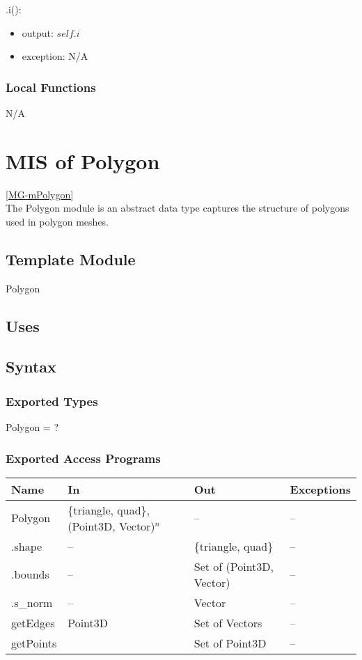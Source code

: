 \documentclass[12pt, titlepage]{article}
\begin{document}
\noindent .i():
\begin{itemize}
	\item output: $self.i$
	\item exception: N/A
\end{itemize}

\subsubsection{Local Functions}
N/A

\newpage

\section{MIS of Polygon} \ref{MG-mPolygon} \\
The Polygon module is an abstract data type captures the structure of polygons 
used in polygon meshes.

\subsection{Template Module}
Polygon

\subsection{Uses}

\subsection{Syntax}
\subsubsection{Exported Types}
Polygon = ?
\subsubsection{Exported Access Programs}
\begin{center}
	\begin{tabular}{p{2cm} p{7cm} p{5cm} p{2cm}}
		\hline
		\textbf{Name} & \textbf{In} & \textbf{Out} & \textbf{Exceptions} \\
		\hline
		Polygon & \{triangle, quad\}, (Point3D, Vector)$^n$ & -- & -- \\
		.shape & -- & \{triangle, quad\} & -- \\
		.bounds & -- & Set of (Point3D, Vector) & -- \\
		.s\_norm & -- & Vector & -- \\
		getEdges & Point3D & Set of Vectors & -- \\
		getPoints & & Set of Point3D & -- \\
		\hline
	\end{tabular}
\end{center}
\end{document}
